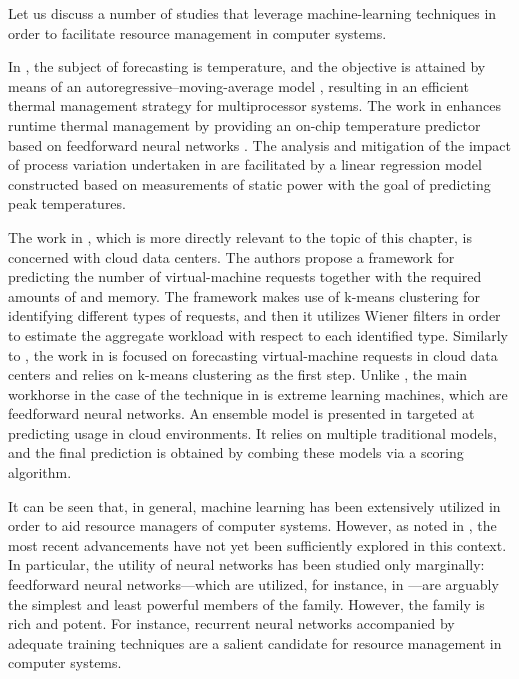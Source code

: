 Let us discuss a number of studies that leverage machine-learning techniques in
order to facilitate resource management in computer systems.

In \cite{coskun2008}, the subject of forecasting is temperature, and the
objective is attained by means of an autoregressive--moving-average model
\cite{hastie2013}, resulting in an efficient thermal management strategy for
multiprocessor systems. The work in \cite{kumar2010} enhances runtime thermal
management by providing an on-chip temperature predictor based on feedforward
neural networks \cite{hastie2013}. The analysis and mitigation of the impact of
process variation undertaken in \cite{juan2014} are facilitated by a linear
regression model \cite{hastie2013} constructed based on measurements of static
power with the goal of predicting peak temperatures.

The work in \cite{dabbagh2015}, which is more directly relevant to the topic of
this chapter, is concerned with cloud data centers. The authors propose a
framework for predicting the number of virtual-machine requests together with
the required amounts of  and memory. The framework makes use of k-means
clustering \cite{hastie2013} for identifying different types of requests, and
then it utilizes Wiener filters in order to estimate the aggregate workload with
respect to each identified type. Similarly to \cite{dabbagh2015}, the work in
\cite{ismaeel2015} is focused on forecasting virtual-machine requests in cloud
data centers and relies on k-means clustering as the first step. Unlike
\cite{dabbagh2015}, the main workhorse in the case of the technique in
\cite{ismaeel2015} is extreme learning machines, which are feedforward neural
networks. An ensemble model \cite{hastie2013} is presented in \cite{cao2014}
targeted at predicting  usage in cloud environments. It relies on
multiple traditional models, and the final prediction is obtained by combing
these models via a scoring algorithm.

It can be seen that, in general, machine learning has been extensively utilized
in order to aid resource managers of computer systems. However, as noted in
, the most recent advancements have not yet been
sufficiently explored in this context. In particular, the utility of neural
networks has been studied only marginally: feedforward neural networks---which
are utilized, for instance, in \cite{kumar2010, ismaeel2015}---are arguably the
simplest and least powerful members of the family. However, the family is rich
and potent. For instance, recurrent neural networks accompanied by adequate
training techniques \cite{goodfellow2016} are a salient candidate for resource
management in computer systems.

